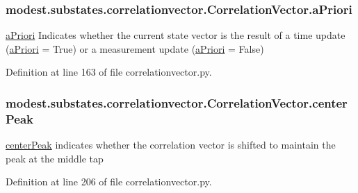 \subsubsection[{\texorpdfstring{a\+Priori}{aPriori}}]{\setlength{\rightskip}{0pt plus 5cm}modest.\+substates.\+correlationvector.\+Correlation\+Vector.\+a\+Priori}\hypertarget{classmodest_1_1substates_1_1correlationvector_1_1CorrelationVector_a9af2ca612576e52c84e98757e53085a8}{}\label{classmodest_1_1substates_1_1correlationvector_1_1CorrelationVector_a9af2ca612576e52c84e98757e53085a8}


\hyperlink{classmodest_1_1substates_1_1correlationvector_1_1CorrelationVector_a9af2ca612576e52c84e98757e53085a8}{a\+Priori} Indicates whether the current state vector is the result of a time update (\hyperlink{classmodest_1_1substates_1_1correlationvector_1_1CorrelationVector_a9af2ca612576e52c84e98757e53085a8}{a\+Priori} = True) or a measurement update (\hyperlink{classmodest_1_1substates_1_1correlationvector_1_1CorrelationVector_a9af2ca612576e52c84e98757e53085a8}{a\+Priori} = False) 



Definition at line 163 of file correlationvector.\+py.

\subsubsection[{\texorpdfstring{center\+Peak}{centerPeak}}]{\setlength{\rightskip}{0pt plus 5cm}modest.\+substates.\+correlationvector.\+Correlation\+Vector.\+center\+Peak}\hypertarget{classmodest_1_1substates_1_1correlationvector_1_1CorrelationVector_a9dbc1cdcfab963b133537b54f0a6d7a6}{}\label{classmodest_1_1substates_1_1correlationvector_1_1CorrelationVector_a9dbc1cdcfab963b133537b54f0a6d7a6}


\hyperlink{classmodest_1_1substates_1_1correlationvector_1_1CorrelationVector_a9dbc1cdcfab963b133537b54f0a6d7a6}{center\+Peak} indicates whether the correlation vector is shifted to maintain the peak at the middle tap 



Definition at line 206 of file correlationvector.\+py.


